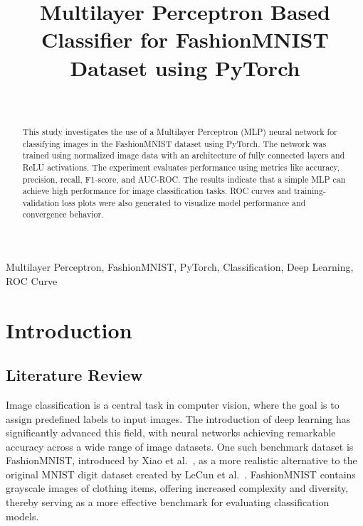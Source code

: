 \documentclass[a4paper, journal]{IEEEtran}
\begin{document}
\title{Multilayer Perceptron Based Classifier for FashionMNIST Dataset using PyTorch}
\author{
     \\
    }

\maketitle

\begin{abstract}
    This study investigates the use of a Multilayer Perceptron (MLP) neural network for classifying images in the FashionMNIST dataset using PyTorch. The network was trained using normalized image data with an architecture of fully connected layers and ReLU activations. The experiment evaluates performance using metrics like accuracy, precision, recall, F1-score, and AUC-ROC. The results indicate that a simple MLP can achieve high performance for image classification tasks. ROC curves and training-validation loss plots were also generated to visualize model performance and convergence behavior.
\end{abstract}

\begin{IEEEkeywords}
    Multilayer Perceptron, FashionMNIST, PyTorch, Classification, Deep Learning, ROC Curve
\end{IEEEkeywords}

\section{Introduction}
\subsection{Literature Review}
Image classification is a central task in computer vision, where the goal is to assign predefined labels to input images. The introduction of deep learning has significantly advanced this field, with neural networks achieving remarkable accuracy across a wide range of image datasets. One such benchmark dataset is FashionMNIST, introduced by Xiao et al.~\cite{xiao2017fashion}, as a more realistic alternative to the original MNIST digit dataset created by LeCun et al.~\cite{lecun1998gradient}. FashionMNIST contains grayscale images of clothing items, offering increased complexity and diversity, thereby serving as a more effective benchmark for evaluating classification models.
\end{document}
